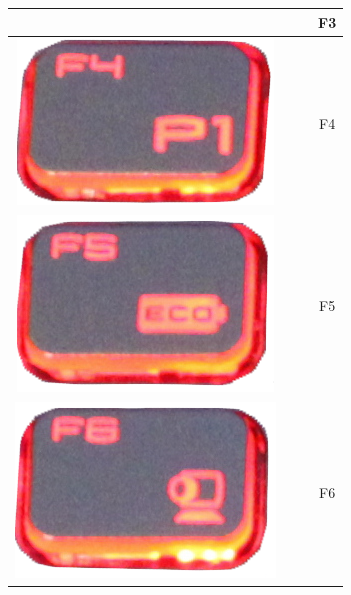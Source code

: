 \begin{longtable}{cccc}
\begin{minipage}[c]{.3\textwidth}
\vspace{0.2cm}
\end{minipage} & & & F3\\
\hline
\begin{minipage}[c]{.3\textwidth}
\vspace{0.2cm}
\includegraphics[scale=0.1]{Images/KeyMapping/F4}
\vspace{0.2cm}
\end{minipage} & & & F4\\
\hline
\begin{minipage}[c]{.3\textwidth}
\vspace{0.2cm}
\includegraphics[scale=0.1]{Images/KeyMapping/F5}
\vspace{0.2cm}
\end{minipage} & & & F5\\
\hline
\begin{minipage}[c]{.3\textwidth}
\vspace{0.2cm}
\includegraphics[scale=0.1]{Images/KeyMapping/F6}
\vspace{0.2cm}
\end{minipage} & & & F6\\

\end{longtable}
